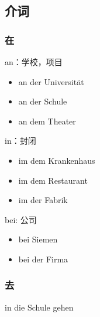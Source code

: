 \subsection{介词}
\subsubsection{在}

an：学校，项目
\begin{itemize}
    \item an der Universität
    \item an der Schule
    \item an dem Theater
\end{itemize}

in：封闭
\begin{itemize}
    \item im dem Krankenhaus
    \item im dem Restaurant
    \item im der Fabrik
\end{itemize}

bei: 公司
\begin{itemize}
    \item bei Siemen
    \item bei der Firma
\end{itemize}

\subsubsection{去}
in die Schule gehen

